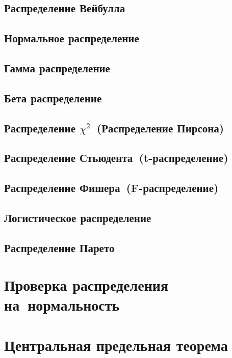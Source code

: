 \documentclass[]{scrartcl}
\begin{document}
\subsection{Распределение Вейбулла}

\subsection{Нормальное распределение}

\subsection{Гамма распределение}

\subsection{Бета распределение}

\subsection{Распределение $\chi^{2}$~(Распределение Пирсона)}

\subsection{Распределение Стьюдента~(t-распределение)}

\subsection{Распределение Фишера~(F-распределение)}
 
\subsection{Логистическое распределение}

\subsection{Распределение Парето}

\section{Проверка распределения на~нормальность}

\section{Центральная предельная теорема}
\end{document}
